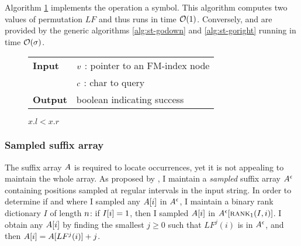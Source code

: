 Algorithm \ref{alg:fm-godownc} implements the operation  a symbol.
This algorithm computes two values of permutation $LF$ and thus runs in time $\mathcal{O}(1)$.
Conversely,  and  are provided by the generic algorithms \ref{alg:st-godown} and \ref{alg:st-goright} running in time $\mathcal{O}(\sigma)$.


\begin{figure*}
\begin{center}
\begin{minipage}[t]{.5\textwidth}
\begin{algorithm}[H]
\begin{tabular}{ll}
\textbf{Input}  & $v$ : pointer to an FM-index node\\
				& $c$ : char to query\\
\textbf{Output} & boolean indicating success\\
\end{tabular}
\begin{algorithmic}[1]
	\State \Return \False
\EndIf
{}
\State \Return $x.l < x.r$
\end{algorithmic}
\label{alg:fm-godownc}
\end{algorithm}
\end{minipage}
\end{center}
\end{figure*}

\subsubsection{Sampled suffix array}

The suffix array $A$ is required to locate occurrences, yet it is not appealing to maintain the whole array.
As proposed by \cite{Ferragina2000}, I maintain a \emph{sampled} suffix array $A^{\epsilon}$ containing positions sampled at regular intervals in the input string.
In order to determine if and where I sampled any $A[i]$ in $A^{\epsilon}$, I maintain a binary rank dictionary $I$ of length $n$: if $I[i]=1$, then I sampled $A[i]$ in $A^{\epsilon}[\textsc{rank}_1(I,i)]$.
I obtain any $A[i]$ by finding the smallest $j \geq 0$ such that $LF^j(i)$ is in $A^{\epsilon}$, and then $A[i] = A[LF^j(i)] + j$.

